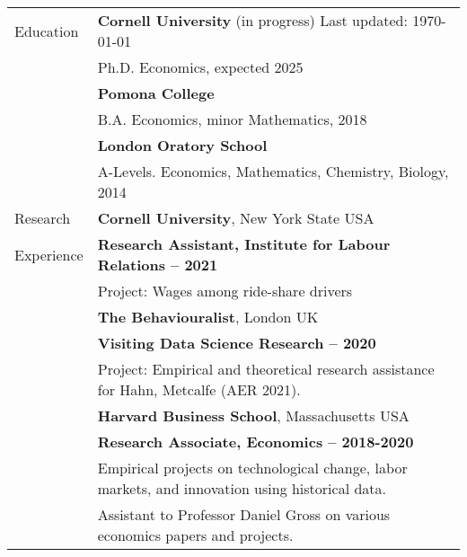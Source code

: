 \documentclass[letterpaper,11pt,oneside]{article}
\begin{document}
\noindent \begin{longtable}{@{} l l}
\Large{Education}
    & \textbf{Cornell University} (in progress)  \hfill Last updated: \today \\
    &  Ph.D. Economics, expected 2025 \vspace{0.1cm} \\
    & \textbf{Pomona College} \\
    &  B.A. Economics, minor Mathematics, 2018 \\
    &  \textbf{London Oratory School}\\
    &  A-Levels. Economics, Mathematics, Chemistry, Biology, 2014 \vspace{0.2cm} \\

\Large{Research}
    & \textbf{Cornell University}, New York State USA \\
\Large{Experience}
    & \textbf{Research Assistant, Institute for Labour Relations -- 2021} \\
    & Project: Wages among ride-share drivers \vspace{0.2cm} \\
    
    & \textbf{The Behaviouralist}, London UK \\
    & \textbf{Visiting Data Science Research -- 2020} \\
    & Project: Empirical and theoretical research assistance for Hahn, Metcalfe (AER 2021). \vspace{0.2cm} \\

    & \textbf{Harvard Business School}, Massachusetts USA \\
    & \textbf{Research Associate, Economics -- 2018-2020} \\
    & Empirical projects on technological change, labor markets, and innovation using historical data.\\
    & Assistant to Professor Daniel Gross on various economics papers and projects. \vspace{0.2cm} \\


\end{longtable}
\end{document}
